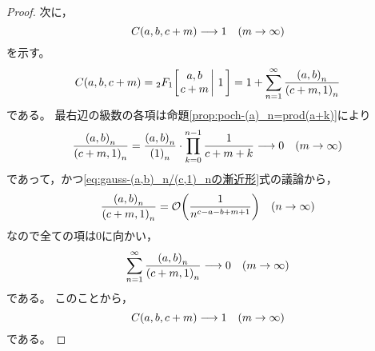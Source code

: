 \documentclass[a4paper,draft]{ltjsarticle}
\begin{document}
\begin{thm}[Kummerの関係]
\begin{proof}
        次に，
        \begin{equation}
            \fun{C}{a,b,c+m}\longrightarrow 1\quad \pare{m\to\infty}
        \end{equation}
        を示す。
        \begin{equation}
            \fun{C}{a,b,c+m}
            =\Gauss{a}{b}{c+m}{1}
            =1+\sum_{n=1}^\infty\frac{\poch{a,b}{n}}{\poch{c+m,1}{n}}
        \end{equation}
        である。
        最右辺の級数の各項は命題\ref{prop:poch-(a)_n=prod(a+k)}により
        \begin{equation}
            \frac{\poch{a,b}{n}}{\poch{c+m,1}{n}}=\frac{\poch{a,b}{n}}{\poch{1}{n}}\cdot \prod_{k=0}^{n-1}\frac{1}{c+m+k}
            \longrightarrow 0\quad \pare{m\to \infty}
        \end{equation}
        であって，かつ\eqref{eq:gauss-(a,b)_n/(c,1)_nの漸近形}式の議論から，
        \begin{equation}
            \frac{\poch{a,b}{n}}{\poch{c+m,1}{n}}=\fun{\mathcal{O}}{\frac{1}{n^{c-a-b+m+1}}}\quad \pare{n\to\infty}
        \end{equation}
        なので全ての項は$0$に向かい，
        \begin{equation}
            \sum_{n=1}^\infty\frac{\poch{a,b}{n}}{\poch{c+m,1}{n}}\longrightarrow 0\quad \pare{m\to\infty}
        \end{equation}
        である。
        このことから，
        \begin{equation}
            \fun{C}{a,b,c+m}\longrightarrow 1\quad \pare{m\to\infty}
        \end{equation}
        である。


\end{proof}
\end{thm}
\end{document}
